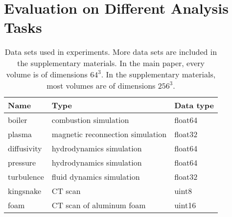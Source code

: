 \section{Evaluation on Different Analysis Tasks} \label{sec:analysis-tasks}

\begin{table}[t]
	\caption{Data sets used in experiments. More data sets are included in the
	supplementary materials. In the main paper, every volume is of dimensions $64^3$. In the 
	supplementary materials, most volumes are of dimensions $256^3$.}
  \centering
  \begin{tabular}{p{}p{}p{}}
  \toprule
  Name & Type & Data type \\
  \midrule
  boiler & combustion simulation& float64\\
  plasma & magnetic reconnection simulation& float32\\
  diffusivity & hydrodynamics simulation& float64\\
  pressure & hydrodynamics simulation& float64\\
	turbulence & fluid dynamics simulation& float32\\
	kingsnake & CT scan & uint8\\
	foam & CT scan of aluminum foam & uint16\\
  \bottomrule
  \end{tabular}\label{tbl:data-sets}
\end{table}


